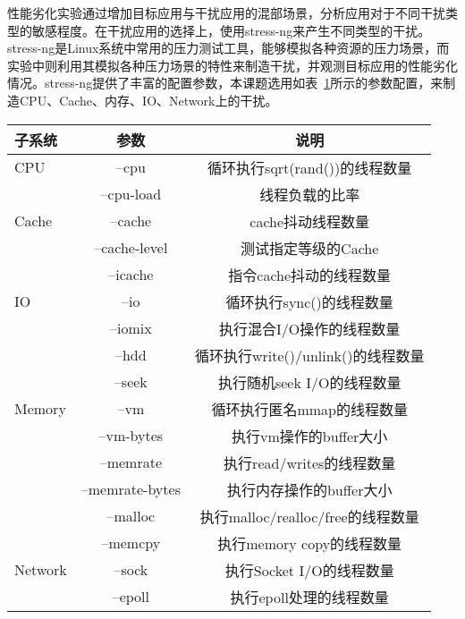 
性能劣化实验通过增加目标应用与干扰应用的混部场景，分析应用对于不同干扰类型的敏感程度。在干扰应用的选择上，使用stress-ng来产生不同类型的干扰。stress-ng是Linux系统中常用的压力测试工具，能够模拟各种资源的压力场景，而实验中则利用其模拟各种压力场景的特性来制造干扰，并观测目标应用的性能劣化情况。stress-ng提供了丰富的配置参数，本课题选用如表~\ref{tab:arg_list}所示的参数配置，来制造CPU、Cache、内存、IO、Network上的干扰。

\begin{table}[H]
    \label{tab:arg_list}
    \footnotesize%
    \setlength{\tabcolsep}{4pt}%
    \renewcommand{\arraystretch}{1.5}%
    \centering
    \begin{tabular}{lcc}
        \hline
        子系统 & 参数 & 说明\\
        \hline
        CPU	    & --cpu & 循环执行sqrt(rand())的线程数量\\
	            & --cpu-load & 线程负载的比率\\
        Cache	& --cache & cache抖动线程数量\\
	            & --cache-level	&测试指定等级的Cache\\
	            & --icache	&指令cache抖动的线程数量\\
        IO	    & --io	&循环执行sync()的线程数量\\
	            & --iomix	&执行混合I/O操作的线程数量\\
	            & --hdd	&循环执行write()/unlink()的线程数量\\
	            & --seek	&执行随机seek I/O的线程数量\\
        Memory	& --vm	&循环执行匿名mmap的线程数量\\
	            & --vm-bytes	&执行vm操作的buffer大小\\
	            & --memrate	&执行read/writes的线程数量\\
	            & --memrate-bytes	&执行内存操作的buffer大小\\
	            & --malloc	&执行malloc/realloc/free的线程数量\\
	            & --memcpy	&执行memory copy的线程数量\\
        Network	& --sock	&执行Socket I/O的线程数量\\
	            & --epoll	&执行epoll处理的线程数量\\
        \hline
    \end{tabular}
\end{table}

